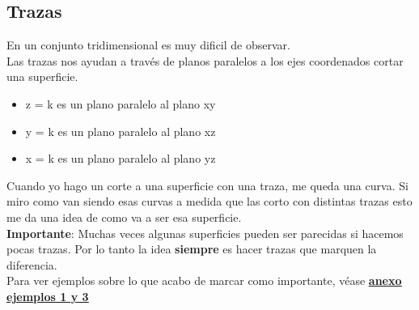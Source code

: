 \documentclass[10pt,a4paper]{article}
\begin{document}
\subsection*{Trazas}
En un conjunto tridimensional es muy dificil de observar. \\
Las trazas nos ayudan a través de planos paralelos a los ejes coordenados cortar una superficie.
\begin{itemize}
    \item z = k es un plano paralelo al plano xy
    \item y = k es un plano paralelo al plano xz
    \item x = k es un plano paralelo al plano yz
\end{itemize}
Cuando yo hago un corte a una superficie con una traza, me queda una curva. Si miro como van siendo esas curvas a medida que las corto con distintas trazas esto me da una idea de como va a ser esa superficie. \\
\textbf{Importante}: Muchas veces algunas superficies pueden ser parecidas si hacemos pocas trazas. Por lo tanto la idea \textbf{siempre} es hacer trazas que marquen la diferencia. \\
Para ver ejemplos sobre lo que acabo de marcar como importante, véase \hyperref[subsec:dibujando_cuadricas_con_trazas]{\textbf{\underline{anexo ejemplos 1 y 3}}} 
\end{document}
